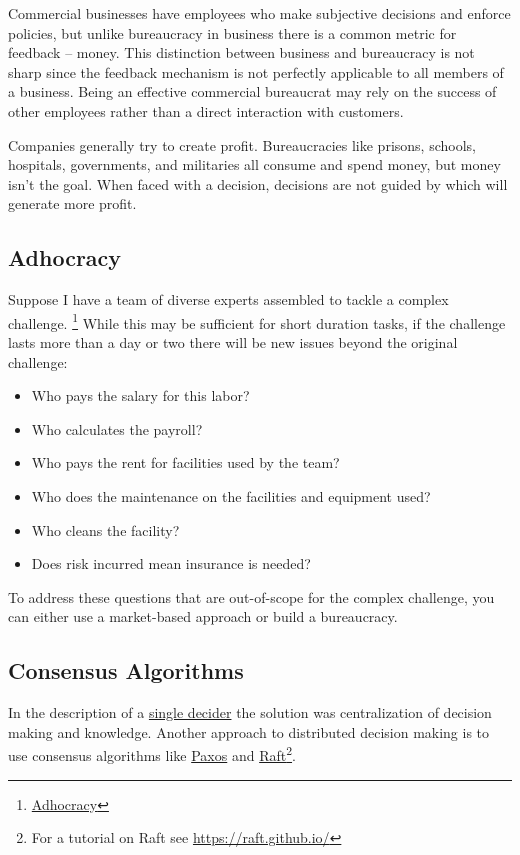 Commercial businesses have employees who make subjective decisions and enforce policies, but unlike bureaucracy in business there is a common metric for feedback -- money. This distinction between business and bureaucracy is not sharp since the feedback mechanism is not perfectly applicable to all members of a business. Being an effective commercial bureaucrat may rely on the success of other employees rather than a direct interaction with customers.

Companies generally try to create profit. 
Bureaucracies like prisons, schools, hospitals, governments, and militaries all consume and spend money, but money isn't the goal. When faced with a decision, decisions are not guided by which will generate more profit. \cite{2012_Wilson}

\subsection*{Adhocracy}

Suppose I have a team of diverse experts assembled to tackle a complex challenge.
\footnote{\href{https://en.wikipedia.org/wiki/Adhocracy}{Adhocracy}}
While this may be sufficient for short duration tasks, if the challenge lasts more than a day or two there will be new issues beyond the original challenge:

\begin{itemize}
    \item Who pays the salary for this labor?
    \item Who calculates the payroll?
    \item Who pays the rent for facilities used by the team?
    \item Who does the maintenance on the facilities and equipment used?
    \item Who cleans the facility?
    \item Does risk incurred mean insurance is needed?
\end{itemize}
To address these questions that are out-of-scope for the complex challenge, you can either use a market-based approach or build a bureaucracy. 

\subsection*{Consensus Algorithms}

In the description of a \hyperref[sec:single-decider]{single decider}
the solution was centralization of decision making and knowledge. Another approach to distributed decision making is to use consensus algorithms like \href{https://en.wikipedia.org/wiki/Paxos_(computer_science)}{Paxos} and \href{https://en.wikipedia.org/wiki/Raft_(algorithm)}{Raft}\footnote{For a tutorial on Raft see \href{https://raft.github.io/}{https://raft.github.io/}}.


